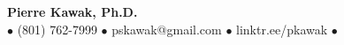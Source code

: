 \documentclass[letterpaper,12pt]{article}
\def\name{Pierre Kawak, Ph.D.}
\begin{document}


\begin{center}
  {\LARGE \textbf{Pierre Kawak, Ph.D.} }\\[1ex]
  $\bullet$ (801) 762-7999 $\bullet$ pskawak@gmail.com $\bullet$ linktr.ee/pkawak $\bullet$ \\
\end{center}
\end{document}

